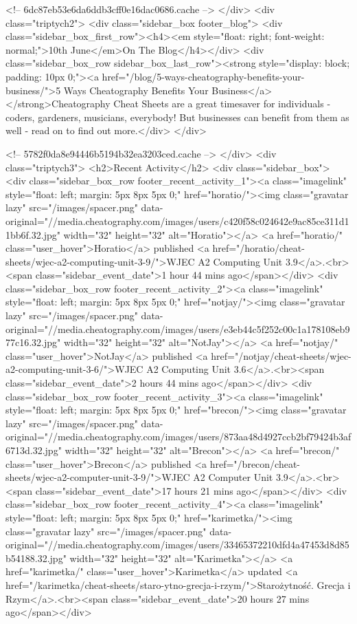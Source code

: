 <!-- 6dc87eb53e6da6ddb3cff0e16dac0686.cache -->            </div>
            <div class="triptych2">
                <div class="sidebar_box footer_blog">
            <div class="sidebar_box_first_row"><h4><em style="float: right; font-weight: normal;">10th June</em>On The Blog</h4></div>
        <div class="sidebar_box_row sidebar_box_last_row"><strong style="display: block; padding: 10px 0;"><a href="/blog/5-ways-cheatography-benefits-your-business/">5 Ways Cheatography Benefits Your Business</a></strong>Cheatography Cheat Sheets are a great timesaver for individuals - coders, gardeners, musicians, everybody! But businesses can benefit from them as well - read on to find out more.</div>
    </div>


<!-- 5782f0da8e94446b5194b32ea3203ced.cache -->            </div>
            <div class="triptych3">
                <h2>Recent Activity</h2>
                <div class="sidebar_box">
            <div class="sidebar_box_row footer_recent_activity_1"><a class="imagelink" style="float: left; margin: 5px 8px 5px 0;" href="horatio/"><img class="gravatar lazy" src="/images/spacer.png" data-original="//media.cheatography.com/images/users/c420f58c024642e9ac85ce311d11bb6f.32.jpg" width="32" height="32" alt="Horatio"></a> <a href="horatio/" class="user_hover">Horatio</a> published <a href="/horatio/cheat-sheets/wjec-a2-computing-unit-3-9/">WJEC A2 Computing Unit 3.9</a>.<br><span class="sidebar_event_date">1 hour 44 mins ago</span></div>
            <div class="sidebar_box_row footer_recent_activity_2"><a class="imagelink" style="float: left; margin: 5px 8px 5px 0;" href="notjay/"><img class="gravatar lazy" src="/images/spacer.png" data-original="//media.cheatography.com/images/users/e3eb44c5f252c00c1a178108eb977c16.32.jpg" width="32" height="32" alt="NotJay"></a> <a href="notjay/" class="user_hover">NotJay</a> published <a href="/notjay/cheat-sheets/wjec-a2-computing-unit-3-6/">WJEC A2 Computing Unit 3.6</a>.<br><span class="sidebar_event_date">2 hours 44 mins ago</span></div>
            <div class="sidebar_box_row footer_recent_activity_3"><a class="imagelink" style="float: left; margin: 5px 8px 5px 0;" href="brecon/"><img class="gravatar lazy" src="/images/spacer.png" data-original="//media.cheatography.com/images/users/873aa48d4927ccb2bf79424b3af6713d.32.jpg" width="32" height="32" alt="Brecon"></a> <a href="brecon/" class="user_hover">Brecon</a> published <a href="/brecon/cheat-sheets/wjec-a2-computer-unit-3-9/">WJEC A2 Computer Unit 3.9</a>.<br><span class="sidebar_event_date">17 hours 21 mins ago</span></div>
            <div class="sidebar_box_row footer_recent_activity_4"><a class="imagelink" style="float: left; margin: 5px 8px 5px 0;" href="karimetka/"><img class="gravatar lazy" src="/images/spacer.png" data-original="//media.cheatography.com/images/users/33465372210dfd4a47453d8d85b54188.32.jpg" width="32" height="32" alt="Karimetka"></a> <a href="karimetka/" class="user_hover">Karimetka</a> updated <a href="/karimetka/cheat-sheets/staro-ytno-grecja-i-rzym/">Starożytność. Grecja i Rzym</a>.<br><span class="sidebar_event_date">20 hours 27 mins ago</span></div>
